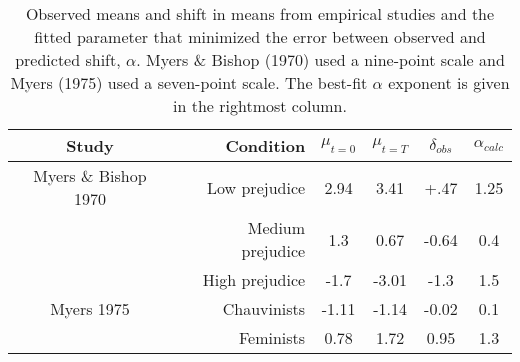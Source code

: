 \documentclass[a4paper,12pt]{article}
\begin{document}



\begin{table}
  \centering
  \caption{Observed means and shift in means from empirical studies and the
  fitted parameter that minimized the error between observed and predicted
  shift, $\alpha$. Myers \& Bishop (1970) used a nine-point scale and 
  Myers (1975) used a seven-point scale. The best-fit $\alpha$ exponent is given
  in the rightmost column.}
  \label{tab:results}
  \vspace{0.5em}
  \begin{tabular}{crcccc}
    Study     & Condition     & $\mu_{t=0}$ & $\mu_{t=T}$ & $\delta_{obs}$ & $\alpha_{calc}$ \\
    \toprule
    Myers \& Bishop 1970 & Low prejudice & 2.94 & 3.41 & +.47 & 1.25 \\
                         & Medium prejudice & 1.3 & 0.67 & -0.64 & 0.4 \\
                         & High prejudice & -1.7 & -3.01 & -1.3 & 1.5 \\
                         \midrule
    Myers 1975 & Chauvinists & -1.11 & -1.14 & -0.02 & 0.1 \\
               & Feminists & 0.78 & 1.72 & 0.95 & 1.3 \\
               \bottomrule
  \end{tabular}
\end{table}
\end{document}
